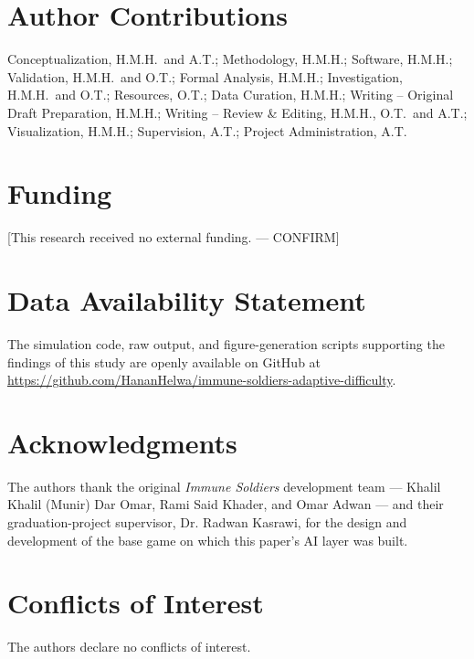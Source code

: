 \documentclass[11pt]{article}
\begin{document}
\section*{Author Contributions}
Conceptualization, H.M.H.\ and A.T.; Methodology, H.M.H.; Software, H.M.H.; Validation, H.M.H.\ and O.T.; Formal Analysis, H.M.H.; Investigation, H.M.H.\ and O.T.; Resources, O.T.; Data Curation, H.M.H.; Writing -- Original Draft Preparation, H.M.H.; Writing -- Review \& Editing, H.M.H., O.T.\ and A.T.; Visualization, H.M.H.; Supervision, A.T.; Project Administration, A.T.

\section*{Funding}
[This research received no external funding. --- CONFIRM] %

\section*{Data Availability Statement}
The simulation code, raw output, and figure-generation scripts supporting the findings of this study are openly available on GitHub at \url{https://github.com/HananHelwa/immune-soldiers-adaptive-difficulty}.

\section*{Acknowledgments}
The authors thank the original \textit{Immune Soldiers} development team --- Khalil Khalil (Munir) Dar Omar, Rami Said Khader, and Omar Adwan --- and their graduation-project supervisor, Dr. Radwan Kasrawi, for the design and development of the base game \cite{ref9} on which this paper's AI layer was built.

\section*{Conflicts of Interest}
The authors declare no conflicts of interest.
\end{document}
